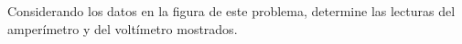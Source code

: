 Considerando los datos en la figura de este problema, determine las lecturas del amperímetro y del voltímetro mostrados.